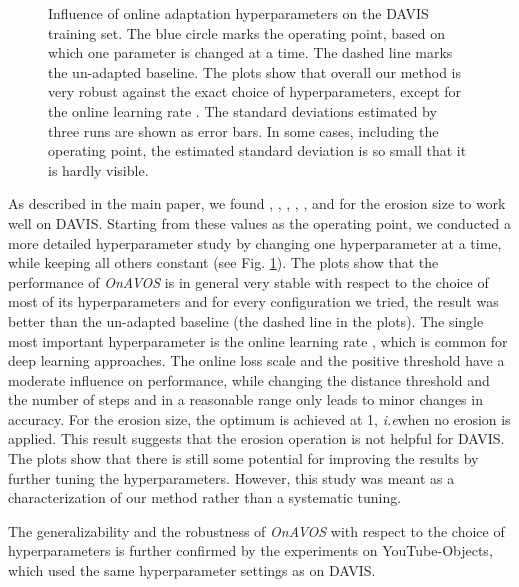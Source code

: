 \documentclass{bmvc2k}
\newcommand{\methodname}[1]{\mbox{\emph{#1}}}
\def\ie{\emph{i.e}\bmvaOneDot}
\begin{document}
\begin{figure}[h!]
\centering
{}
\hfill
{}
\hfill
{}
\hfill
{}
\hfill
{}


\caption{\label{fig:hyperparams}Influence of online adaptation hyperparameters on the DAVIS training set. The blue circle marks the operating point, based on which one parameter is changed at a time. The dashed line marks the un-adapted baseline. The plots show that overall our method is very robust against the exact choice of hyperparameters, except for the online learning rate . The standard deviations estimated by three runs are shown as error bars. In some cases, including the operating point, the estimated standard deviation is so small that it is hardly visible.}
\end{figure}

As described in the main paper, we found , , , , ,  and  for the erosion size to work well on DAVIS. Starting from these values as the operating point, we conducted a more detailed hyperparameter study by changing one hyperparameter at a time, while keeping all others constant (see Fig. \ref{fig:hyperparams}). The plots show that the performance of \methodname{OnAVOS} is in general very stable with respect to the choice of most of its hyperparameters and for every configuration we tried, the result was better than the un-adapted baseline (the dashed line in the plots). The single most important hyperparameter is the online learning rate , which is common for deep learning approaches. The online loss scale  and the positive threshold  have a moderate influence on performance, while changing the distance threshold  and the number of steps  and  in a reasonable range only leads to minor changes in accuracy. For the erosion size, the optimum is achieved at 1, \ie when no erosion is applied. This result suggests that the erosion operation is not helpful for DAVIS. The plots show that there is still some potential for improving the results by further tuning the hyperparameters. However, this study was meant as a characterization of our method rather than a systematic tuning. 

The generalizability and the robustness of \methodname{OnAVOS} with respect to the choice of hyperparameters is further confirmed by the experiments on YouTube-Objects, which used the same hyperparameter settings as on DAVIS.
\end{document}
